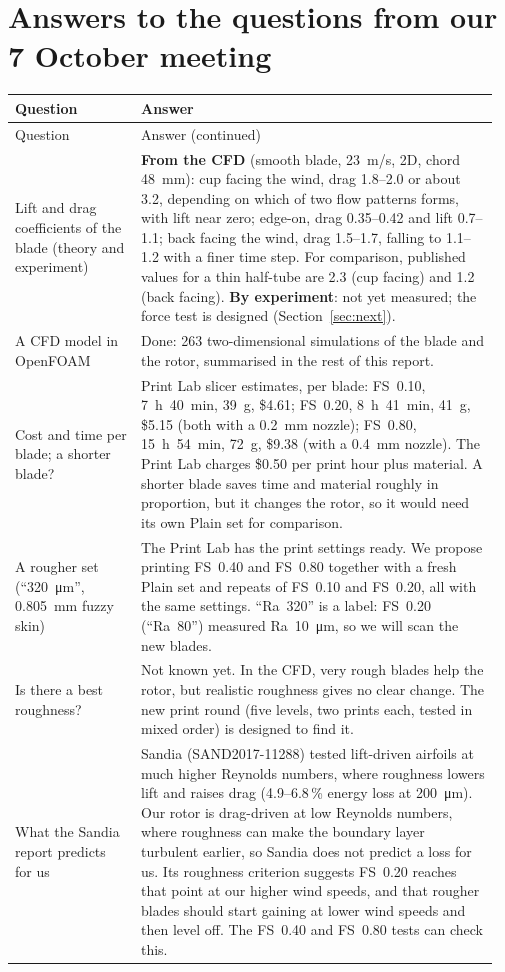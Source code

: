 \documentclass[11pt]{article}
\begin{document}
\section{Answers to the questions from our 7 October meeting}
{\small
\begin{longtable}{@{}>{\raggedright\arraybackslash}p{0.25\linewidth} >{\raggedright\arraybackslash}p{0.71\linewidth}@{}}
\toprule
Question & Answer \\
\midrule
\endfirsthead
\toprule
Question & Answer (continued) \\
\midrule
\endhead
\bottomrule
\endlastfoot
Lift and drag coefficients of the blade (theory and experiment) &
\textbf{From the CFD} (smooth blade, 23~m/s, 2D, chord \SI{48}{mm}):
cup facing the wind, drag 1.8--2.0 or about 3.2, depending on which of two flow patterns forms, with lift
near zero; edge-on, drag 0.35--0.42 and lift 0.7--1.1; back facing the wind, drag 1.5--1.7, falling to
1.1--1.2 with a finer time step. For comparison, published values for a thin half-tube are 2.3 (cup
facing) and 1.2 (back facing). \textbf{By experiment}: not yet measured; the force test is designed
(Section~\ref{sec:next}). \\
\addlinespace
A CFD model in OpenFOAM &
Done: 263 two-dimensional simulations of the blade and the rotor, summarised in the rest of this report. \\
\addlinespace
Cost and time per blade; a shorter blade? &
Print Lab slicer estimates, per blade: FS~0.10, 7~h~40~min, \SI{39}{g}, \$4.61; FS~0.20, 8~h~41~min,
\SI{41}{g}, \$5.15 (both with a \SI{0.2}{mm} nozzle); FS~0.80, 15~h~54~min, \SI{72}{g}, \$9.38 (with
a \SI{0.4}{mm} nozzle). The Print Lab charges \$0.50 per print hour plus material. A shorter blade
saves time and material roughly in proportion, but it changes the rotor, so it would need its own
Plain set for comparison. \\
\addlinespace
A rougher set (``\SI{320}{\micro\metre}'', \SI{0.805}{mm} fuzzy skin) &
The Print Lab has the print settings ready. We propose printing FS~0.40 and FS~0.80 together with a
fresh Plain set and repeats of FS~0.10 and FS~0.20, all with the same settings. ``Ra~320'' is a
label: FS~0.20 (``Ra~80'') measured Ra~\SI{10}{\micro\metre}, so we will scan the new blades. \\
\addlinespace
Is there a best roughness? &
Not known yet. In the CFD, very rough blades help the rotor, but realistic roughness gives no clear
change. The new print round (five levels, two prints each, tested in mixed order) is designed to find
it. \\
\addlinespace
What the Sandia report predicts for us &
Sandia (SAND2017-11288) tested lift-driven airfoils at much higher Reynolds numbers, where roughness
lowers lift and raises drag (4.9--6.8\,\% energy loss at \SI{200}{\micro\metre}). Our rotor is
drag-driven at low Reynolds numbers, where roughness can make the boundary layer turbulent earlier,
so Sandia does not predict a loss for us. Its roughness criterion suggests FS~0.20 reaches that point
at our higher wind speeds, and that rougher blades should start gaining at lower wind speeds and then
level off. The FS~0.40 and FS~0.80 tests can check this. \\
\end{longtable}
}
\end{document}
